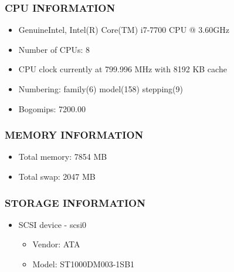 \documentclass[a4paper]{report}
\begin{document}
\subsubsection{CPU INFORMATION}
\begin{itemize}
\item GenuineIntel, Intel(R) Core(TM) i7-7700 CPU @ 3.60GHz
\item Number of CPUs: 8
\item CPU clock currently at 799.996 MHz with 8192 KB cache
\item Numbering: family(6) model(158) stepping(9)
\item	Bogomips: 7200.00
\end{itemize}
\subsubsection{MEMORY INFORMATION}
\begin{itemize}
\item Total memory: 7854 MB
\item Total swap: 2047 MB
\end{itemize}
\subsubsection{STORAGE INFORMATION}
\begin{itemize}
\item SCSI device -  scsi0 \begin{itemize}
\item Vendor:  ATA
\item Model:  ST1000DM003-1SB1 
\end{itemize}
\end{itemize}
\end{document}
